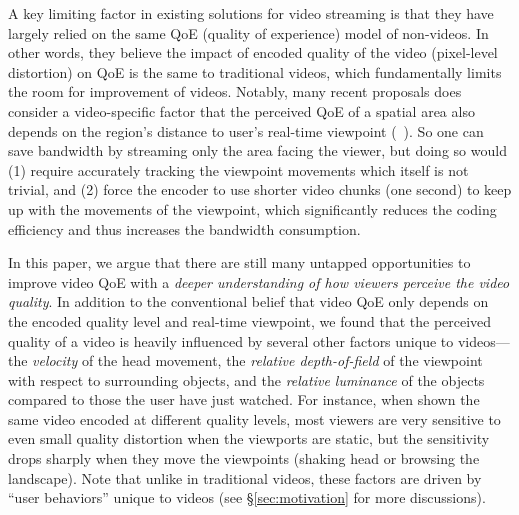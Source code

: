 A key limiting factor in existing solutions for \vr video streaming is that they have largely relied on the same QoE (quality of experience) model of non-\vr videos. 
In other words, they believe the impact of encoded quality of the video (\eg pixel-level distortion) on QoE is the same to traditional videos, which fundamentally limits the room for improvement of \vr videos.
Notably, many recent proposals does consider a {\vr}video-specific factor that the perceived QoE of a spatial area also depends on the region's distance to user's real-time viewpoint (\eg~\cite{??,??,??,??}).
So one can save bandwidth by streaming only the area facing the viewer, but doing so would (1) require accurately tracking the viewpoint movements which itself is not trivial, and (2) force the encoder to use shorter video chunks (\eg one second) to keep up with the movements of the viewpoint, which significantly reduces the coding efficiency and thus increases the bandwidth consumption.

In this paper, we argue that there are still many untapped opportunities to improve \vr video QoE with a {\em deeper understanding of how viewers perceive the \vr video quality}.
In addition to the conventional belief that \vr video QoE only depends on the encoded quality level and real-time viewpoint, 
we found that the perceived quality of a \vr video is heavily influenced by several other factors unique to \vr videos---the {\em velocity} of the head movement, the {\em relative depth-of-field} of the viewpoint with respect to surrounding objects, and the {\em relative luminance} of the objects compared to those the user have just watched. 
For instance, when shown the same video encoded at different quality levels, most viewers are very sensitive to even small quality distortion when the viewports are static, but the sensitivity drops sharply when they move the viewpoints (\eg shaking head or browsing the landscape). 
Note that unlike in traditional videos, these factors are driven by ``user behaviors'' unique to \vr videos (see \S\ref{sec:motivation} for more discussions).


